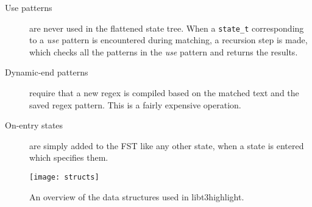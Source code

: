 \documentclass[a4paper]{article}
\newcommand{\state}{{\tt state_t}\xspace}
\begin{document}
\begin{multicols}{2}
\begin{description}
\item[Use patterns] are never used in the flattened state tree. When a
\state corresponding to a {\it use} pattern is encountered during matching, a
recursion step is made, which checks all the patterns in the {\it use} pattern
and returns the results.
\item[Dynamic-end patterns] require that a new regex is compiled based on the
matched text and the saved regex pattern. This is a fairly expensive operation.
\item[On-entry states] are simply added to the FST like any other state, when
a state is entered which specifies them.
\end{description}
\end{multicols}

\begin{figure}
\centering
\texttt{[image: structs]}
\caption{An overview of the data structures used in libt3highlight.}
\end{figure}
\end{document}
